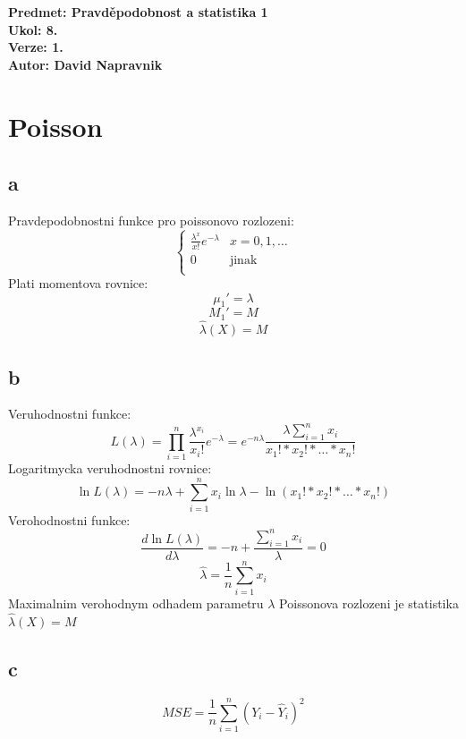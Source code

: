 \documentclass[a4paper]{article}
\begin{document}
\noindent
\textbf{Predmet: Pravděpodobnost a statistika 1}\\
\textbf{Ukol: 8.}\\
\textbf{Verze: 1.}\\
\textbf{Autor: David Napravnik}

\section*{Poisson}

\subsection*{a}
Pravdepodobnostni funkce pro poissonovo rozlozeni:\\
\[
\begin{cases}
\frac{\lambda^x}{x!}e^{-\lambda}&\text{$x=0,1, \dots$}\\
0&\text{jinak}\\
\end{cases}
\]
Plati momentova rovnice:
$$\mu_1'=\lambda$$
$$M_1' = M$$
$$\hat{\lambda}(X)=M$$


\subsection*{b}
Veruhodnostni funkce:
$$
L(\lambda) = \prod^n_{i=1}\frac{\lambda^{x_i}}{x_i!}e^{-\lambda} = e^{-n\lambda}\frac{\lambda\sum^n_{i=1}x_i}{x_1!*x_2!* \dots *x_n!}
$$
Logaritmycka veruhodnostni rovnice:
$$
\ln L(\lambda)=-n\lambda+\sum^n_{i=1}x_i\ln\lambda-\ln(x_1!*x_2!* \dots *x_n!)
$$
Verohodnostni funkce:
$$
\frac{d\ln L(\lambda)}{d\lambda}=-n+\frac{\sum^n_{i=1}x_i}{\lambda} = 0
$$$$
\hat{\lambda}=\frac{1}{n}\sum^n_{i=1}x_i
$$
Maximalnim verohodnym odhadem parametru $\lambda$ Poissonova rozlozeni je statistika $\hat{\lambda}(X) = M$



\subsection*{c}
$$
MSE = \frac{1}{n}\sum^n_{i=1}(Y_i-\hat{Y}_i)^2
$$
\end{document}
